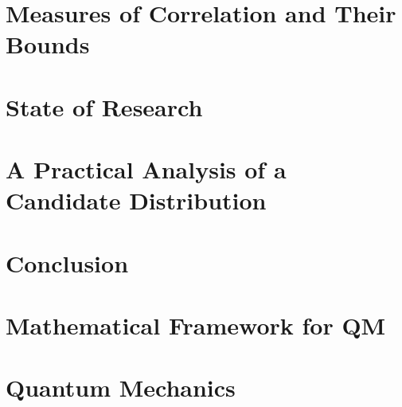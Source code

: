 \documentclass[titlepage]{report}
\theoremstyle{remark}
\begin{document}
\chapter{Measures of Correlation and Their Bounds}

 \chapter{State of Research}
 
 \chapter{A Practical Analysis of a Candidate Distribution}
 
 \chapter{Conclusion}
 

\begin{appendices}
	\chapter{Mathematical Framework for QM}
	
	\chapter{Quantum Mechanics}
	
%	
\end{appendices}

%
\printbibliography
\end{document}
